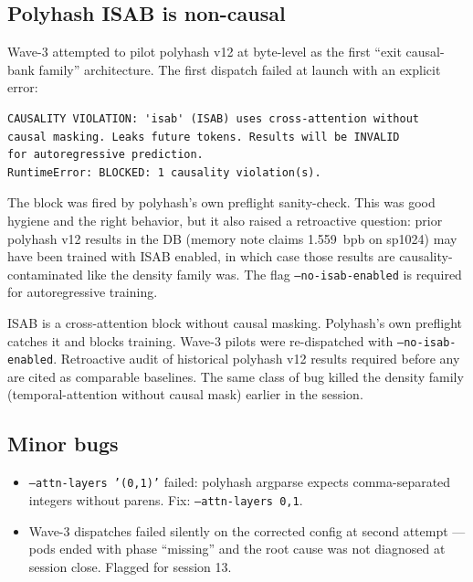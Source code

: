 \subsection{Polyhash ISAB is non-causal}

Wave-3 attempted to pilot polyhash v12 at byte-level as the first ``exit causal-bank family'' architecture. The first dispatch failed at launch with an explicit error:

\begin{verbatim}
CAUSALITY VIOLATION: 'isab' (ISAB) uses cross-attention without
causal masking. Leaks future tokens. Results will be INVALID
for autoregressive prediction.
RuntimeError: BLOCKED: 1 causality violation(s).
\end{verbatim}

The block was fired by polyhash's own preflight sanity-check. This was good hygiene and the right behavior, but it also raised a retroactive question: prior polyhash v12 results in the DB (memory note claims 1.559~bpb on sp1024) may have been trained with ISAB enabled, in which case those results are causality-contaminated like the density family was. The flag \texttt{--no-isab-enabled} is required for autoregressive training.

\begin{bug}
ISAB is a cross-attention block without causal masking. Polyhash's own preflight catches it and blocks training. Wave-3 pilots were re-dispatched with \texttt{--no-isab-enabled}. Retroactive audit of historical polyhash v12 results required before any are cited as comparable baselines. The same class of bug killed the density family (temporal-attention without causal mask) earlier in the session.
\end{bug}

\subsection{Minor bugs}

\begin{itemize}
  \item \texttt{--attn-layers '(0,1)'} failed: polyhash argparse expects comma-separated integers without parens. Fix: \texttt{--attn-layers 0,1}.
  \item Wave-3 dispatches failed silently on the corrected config at second attempt --- pods ended with phase ``missing'' and the root cause was not diagnosed at session close. Flagged for session 13.
\end{itemize}

